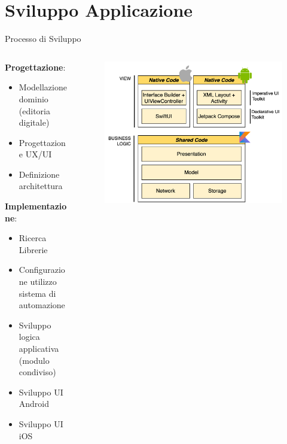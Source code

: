 
\section{Sviluppo Applicazione}

\begin{frame}{Processo di Sviluppo}
    \begin{columns}[onlytextwidth]
        \begin{column}{0.4\textwidth}
            \textbf{Progettazione}:
            \begin{itemize}
                \item Modellazione dominio (editoria digitale)
                \item Progettazione UX/UI
                \item Definizione architettura
            \end{itemize}
            \vspace{3mm}
            \textbf{Implementazione}:
            \begin{itemize}
                \item Ricerca Librerie
                \item Configurazione utilizzo sistema di automazione
                \item Sviluppo logica applicativa (modulo condiviso)
                \item Sviluppo UI Android
                \item Sviluppo UI iOS
            \end{itemize}
        \end{column}
        \begin{column}{0.6\textwidth}
             \begin{figure}[H]
                \includegraphics[width=1\textwidth]{img/stack_kmm.png}
            \end{figure}
        \end{column}
    \end{columns}
\end{frame}

